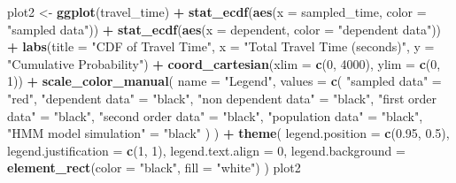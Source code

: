 \documentclass[
]{article}
\newenvironment{Shaded}{\begin{snugshade}}{\end{snugshade}}
\newcommand{\AttributeTok}[1]{\textcolor[rgb]{0.13,0.29,0.53}{#1}}
\newcommand{\DecValTok}[1]{\textcolor[rgb]{0.00,0.00,0.81}{#1}}
\newcommand{\FloatTok}[1]{\textcolor[rgb]{0.00,0.00,0.81}{#1}}
\newcommand{\FunctionTok}[1]{\textcolor[rgb]{0.13,0.29,0.53}{\textbf{#1}}}
\newcommand{\NormalTok}[1]{#1}
\newcommand{\OtherTok}[1]{\textcolor[rgb]{0.56,0.35,0.01}{#1}}
\newcommand{\SpecialCharTok}[1]{\textcolor[rgb]{0.81,0.36,0.00}{\textbf{#1}}}
\newcommand{\StringTok}[1]{\textcolor[rgb]{0.31,0.60,0.02}{#1}}
\begin{document}
\begin{Shaded}
\begin{Highlighting}[]
\NormalTok{plot2 }\OtherTok{\textless{}{-}} \FunctionTok{ggplot}\NormalTok{(travel\_time) }\SpecialCharTok{+}
  \FunctionTok{stat\_ecdf}\NormalTok{(}\FunctionTok{aes}\NormalTok{(}\AttributeTok{x =}\NormalTok{ sampled\_time, }\AttributeTok{color =} \StringTok{"sampled data"}\NormalTok{)) }\SpecialCharTok{+}
  \FunctionTok{stat\_ecdf}\NormalTok{(}\FunctionTok{aes}\NormalTok{(}\AttributeTok{x =}\NormalTok{ dependent, }\AttributeTok{color =} \StringTok{"dependent data"}\NormalTok{)) }\SpecialCharTok{+}
  \FunctionTok{labs}\NormalTok{(}\AttributeTok{title =} \StringTok{"CDF of Travel Time"}\NormalTok{, }\AttributeTok{x =} \StringTok{"Total Travel Time (seconds)"}\NormalTok{, }\AttributeTok{y =} \StringTok{"Cumulative Probability"}\NormalTok{) }\SpecialCharTok{+}
  \FunctionTok{coord\_cartesian}\NormalTok{(}\AttributeTok{xlim =} \FunctionTok{c}\NormalTok{(}\DecValTok{0}\NormalTok{, }\DecValTok{4000}\NormalTok{), }\AttributeTok{ylim =} \FunctionTok{c}\NormalTok{(}\DecValTok{0}\NormalTok{, }\DecValTok{1}\NormalTok{)) }\SpecialCharTok{+}
  \FunctionTok{scale\_color\_manual}\NormalTok{(}
    \AttributeTok{name =} \StringTok{"Legend"}\NormalTok{,}
    \AttributeTok{values =} \FunctionTok{c}\NormalTok{(}
      \StringTok{"sampled data"} \OtherTok{=} \StringTok{"red"}\NormalTok{,}
      \StringTok{"dependent data"} \OtherTok{=} \StringTok{"black"}\NormalTok{,}
      \StringTok{"non dependent data"} \OtherTok{=} \StringTok{"black"}\NormalTok{,}
      \StringTok{"first order data"} \OtherTok{=} \StringTok{"black"}\NormalTok{,}
      \StringTok{"second order data"} \OtherTok{=} \StringTok{"black"}\NormalTok{,}
      \StringTok{"population data"} \OtherTok{=} \StringTok{"black"}\NormalTok{,}
      \StringTok{"HMM model simulation"} \OtherTok{=} \StringTok{"black"}
\NormalTok{    )}
\NormalTok{  ) }\SpecialCharTok{+}
  \FunctionTok{theme}\NormalTok{(}
    \AttributeTok{legend.position =} \FunctionTok{c}\NormalTok{(}\FloatTok{0.95}\NormalTok{, }\FloatTok{0.5}\NormalTok{),}
    \AttributeTok{legend.justification =} \FunctionTok{c}\NormalTok{(}\DecValTok{1}\NormalTok{, }\DecValTok{1}\NormalTok{),}
    \AttributeTok{legend.text.align =} \DecValTok{0}\NormalTok{,}
    \AttributeTok{legend.background =} \FunctionTok{element\_rect}\NormalTok{(}\AttributeTok{color =} \StringTok{"black"}\NormalTok{, }\AttributeTok{fill =} \StringTok{"white"}\NormalTok{)}
\NormalTok{  )}
\NormalTok{plot2}
\end{Highlighting}
\end{Shaded}
\end{document}
